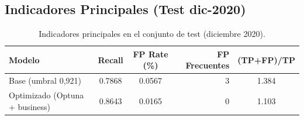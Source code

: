 \documentclass[a4paper,12pt]{article}
\begin{document}
\subsection{Indicadores Principales (Test dic-2020)}
\begin{table}[h]
    \centering
    \begin{tabular}{l S[table-format=1.4] S[table-format=1.4] r S[table-format=1.3]}
        \toprule
        \textbf{Modelo} & \textbf{Recall} & {\textbf{FP Rate (\%)}} & {\textbf{FP Frecuentes}} & {\textbf{(TP+FP)/TP}} \\
        \midrule
        Base (umbral 0,921) & 0.7868 & 0.0567 & 3 & 1.384 \\
        Optimizado (Optuna + business) & 0.8643 & 0.0165 & 0 & 1.103 \\
        \bottomrule
    \end{tabular}
    \caption{Indicadores principales en el conjunto de test (diciembre 2020).}
    \label{tab:results}
\end{table}
\end{document}
